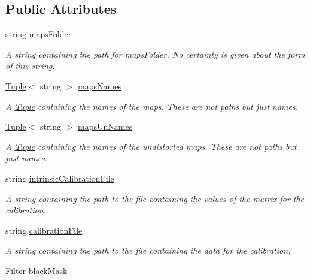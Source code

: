 \subsection*{Public Attributes}
\begin{DoxyCompactItemize}
\item 
string \mbox{\hyperlink{class_settings_aeddfd4457036a14cb0a48d50d9e6ccfe}{maps\+Folder}}
\begin{DoxyCompactList}\small\item\em A string containing the path for maps\+Folder. No certainty is given about the form of this string. \end{DoxyCompactList}\item 
\mbox{\hyperlink{class_tuple}{Tuple}}$<$ string $>$ \mbox{\hyperlink{class_settings_a4a464c938e96639861dc2deb773a2fb8}{maps\+Names}}
\begin{DoxyCompactList}\small\item\em A \mbox{\hyperlink{class_tuple}{Tuple}} containing the names of the maps. These are not paths but just names. \end{DoxyCompactList}\item 
\mbox{\hyperlink{class_tuple}{Tuple}}$<$ string $>$ \mbox{\hyperlink{class_settings_a1866d578ad33e56429a88617a655f9c6}{maps\+Un\+Names}}
\begin{DoxyCompactList}\small\item\em A \mbox{\hyperlink{class_tuple}{Tuple}} containing the names of the undistorted maps. These are not paths but just names. \end{DoxyCompactList}\item 
string \mbox{\hyperlink{class_settings_a634e9900615e8d5b46b08e0fc86d67a5}{intrinsic\+Calibration\+File}}
\begin{DoxyCompactList}\small\item\em A string containing the path to the file containing the values of the matrix for the calibration. \end{DoxyCompactList}\item 
string \mbox{\hyperlink{class_settings_ac6ff9ca8d90b9e43e26c069c88b7c699}{calibration\+File}}
\begin{DoxyCompactList}\small\item\em A string containing the path to the file containing the data for the calibration. \end{DoxyCompactList}\item 
\mbox{\hyperlink{class_filter}{Filter}} \mbox{\hyperlink{class_settings_a78ac37593a52a83973e18deefb2cc96c}{black\+Mask}}

\end{DoxyCompactItemize}
